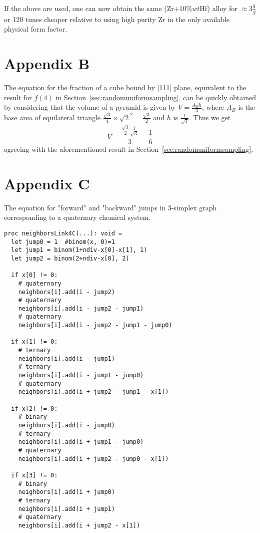 If the above are used, one can now obtain the same (Zr+$10\%wt$Hf) alloy for $\approx 3\frac{\$}{g}$ or 120 times cheaper relative to using high purity Zr in the only available physical form factor.
    

\section*{Appendix B}  \label{app2}

The equation for the fraction of a cube bound by [111] plane, equivalent to the result for $f(4)$ in Section~\ref{sec:randomuniformsampling}, can be quickly obtained by considering that the volume of a pyramid is given by $V = \frac{A_B h}{3}$, where $A_B$ is the base area of equilateral triangle $\frac{\sqrt{3}}{4}\times\sqrt{2}^2 = \frac{\sqrt{3}}{2}$ and $h$ is $\frac{1}{\sqrt{3}}$. Thus we get 
$$V = \frac{\frac{\sqrt{3}}{2} \frac{1}{\sqrt{3}}}{3} = \frac{1}{6}$$ 
agreeing with the aforementioned result in Section~\ref{sec:randomuniformsampling}.

\section*{Appendix C}  \label{app3}

The equation for "forward" and "backward" jumps in 3-simplex graph corresponding to a quaternary chemical system. 

\begin{verbatim}
proc neighborsLink4C(...): void =
  let jump0 = 1  #binom(x, 0)=1
  let jump1 = binom(1+ndiv-x[0]-x[1], 1)
  let jump2 = binom(2+ndiv-x[0], 2)
  
  if x[0] != 0:
    # quaternary
    neighbors[i].add(i - jump2)
    # quaternary
    neighbors[i].add(i - jump2 - jump1)
    # quaternary
    neighbors[i].add(i - jump2 - jump1 - jump0) 
  
  if x[1] != 0:
    # ternary
    neighbors[i].add(i - jump1)    
    # ternary
    neighbors[i].add(i - jump1 - jump0)         
    # quaternary
    neighbors[i].add(i + jump2 - jump1 - x[1])  
  
  if x[2] != 0:
    # binary
    neighbors[i].add(i - jump0)     
    # ternary
    neighbors[i].add(i + jump1 - jump0)    
    # quaternary
    neighbors[i].add(i + jump2 - jump0 - x[1])  
  
  if x[3] != 0:
    # binary
    neighbors[i].add(i + jump0)        
    # ternary
    neighbors[i].add(i + jump1)          
    # quaternary     
    neighbors[i].add(i + jump2 - x[1])              
\end{verbatim}

\printbibliography[heading=subbibintoc]
